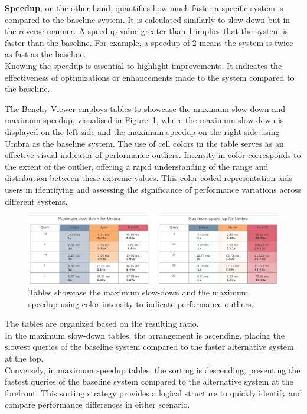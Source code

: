 \textbf{Speedup}, on the other hand, quantifies how much faster a specific system is compared to the baseline system. It is calculated similarly to slow-down but in the reverse manner. A speedup value greater than 1 implies that the system is faster than the baseline. For example, a speedup of 2 means the system is twice as fast as the baseline.\\
Knowing the speedup is essential to highlight improvements. It indicates the effectiveness of optimizations or enhancements made to the system compared to the baseline.

The Benchy Viewer employs tables to showcase the maximum slow-down and maximum speedup, visualised in Figure~\ref{fig:slowdown-speedup-chart}, where the maximum slow-down is displayed on the left side and the maximum speedup on the right side using Umbra as the baseline system. The use of cell colors in the table serves as an effective visual indicator of performance outliers. Intensity in color corresponds to the extent of the outlier, offering a rapid understanding of the range and distribution between these extreme values. This color-coded representation aids users in identifying and assessing the significance of performance variations across different systems.

\begin{figure}[h]
  \centering
  \includegraphics[width=1\linewidth]{figures/bsp-table-speedup-slowdown.png}
  \caption{Tables showcase the maximum slow-down and the maximum speedup using color intensity to indicate performance outliers.}
  \label{fig:slowdown-speedup-chart}
\end{figure}

The tables are organized based on the resulting ratio.\\
In the maximum slow-down tables, the arrangement is ascending, placing the slowest queries of the baseline system compared to the faster alternative system at the top.\\
Conversely, in maximum speedup tables, the sorting is descending, presenting the fastest queries of the baseline system compared to the alternative system at the forefront. This sorting strategy provides a logical structure to quickly identify and compare performance differences in either scenario.

